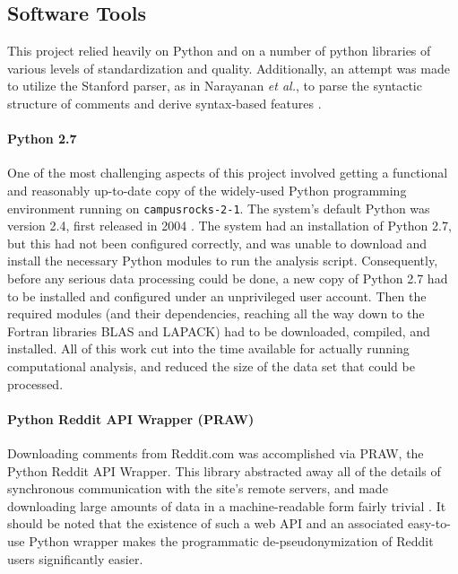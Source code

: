 \documentclass[12pt]{article}
\begin{document}
\subsection{Software Tools}
This project relied heavily on Python and on a number of python libraries of various levels of standardization and quality. Additionally, an attempt was made to utilize the Stanford parser, as in Narayanan \textit{et al.}, to parse the syntactic structure of comments and derive syntax-based features \cite{klein2003accurate, narayanan2012feasibility}.

\paragraph{Python 2.7}
One of the most challenging aspects of this project involved getting a functional and reasonably up-to-date copy of the widely-used Python programming environment running on \texttt{campusrocks-2-1}. The system's default Python was version 2.4, first released in 2004 \cite{python2004python}. The system had an installation of Python 2.7, but this had not been configured correctly, and was unable to download and install the necessary Python modules to run the analysis script. Consequently, before any serious data processing could be done, a new copy of Python 2.7 had to be installed and configured under an unprivileged user account. Then the required modules (and their dependencies, reaching all the way down to the Fortran libraries BLAS and LAPACK) had to be downloaded, compiled, and installed. All of this work cut into the time available for actually running computational analysis, and reduced the size of the data set that could be processed.

\paragraph{Python Reddit API Wrapper (PRAW)}
Downloading comments from Reddit.com was accomplished via PRAW, the Python Reddit API Wrapper. This library abstracted away all of the details of synchronous communication with the site's remote servers, and made downloading large amounts of data in a machine-readable form fairly trivial \cite{boe2012python}. It should be noted that the existence of such a web API and an associated easy-to-use Python wrapper makes the programmatic de-pseudonymization of Reddit users significantly easier.
\end{document}
